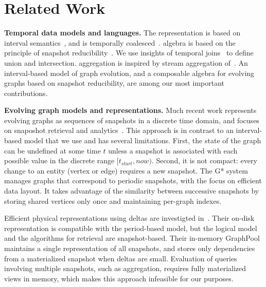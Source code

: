 \section{Related Work}
\label{sec:related}

{\bf Temporal data models and languages.} 
The \tg representation is based on
interval semantics~\cite{DBLP:reference/db/JensenS09k}, and is
temporally coalesced~\cite{DBLP:conf/vldb/BohlenSS96}.  \tg algebra is
based on the principle of snapshot
reducibility~\cite{DBLP:reference/db/Bohlen092}.  We use insights of
temporal joins~\cite{Gao2005} to define \tg union and intersection.
aggregation is inspired by stream aggregation of~\cite{Li2005}.  An
interval-based model of graph evolution, and a composable algebra for
evolving graphs based on snapshot reducibility, are among our most
important contributions.

{\bf Evolving graph models and representations.} Much recent work represents evolving graphs as sequences
of snapshots in a discrete time domain, and focuses on snaposhot
retrieval and
analytics~\cite{Khurana2013,Miao2015,Ren2011}.
This approach is in contrast to an interval-based model that we use and has
several limitations.  First, the state of the graph can be undefined
at some time $t$ unless a snapshot is associated with each possible
value in the discrete range $[t_{start}, now)$.  Second, it is not
  compact: every change to an entity (vertex or edge) requires a new
  snapshot.
%
The G* system~\cite{Labouseur2015} manages graphs that correspond to
periodic snapshots, with the focus on efficient data layout.  It takes
advantage of the similarity between successive snapshots by storing
shared vertices only once and maintaining per-graph indexes. 

Efficient physical representations using deltas are investigted
in~\cite{Khurana2013}.  Their on-disk representation is compatible
with the period-based model, but the logical model and the algorithms
for retrieval are snapshot-based.  Their in-memory GraphPool maintains
a single representation of all snapshots, and stores only dependencies
from a materialized snapshot when deltas are small.  Evaluation of
queries involving multiple snapshots, such as aggregation, requires
fully materialized views in memory, which makes this approach
infeasible for our purposes.  

